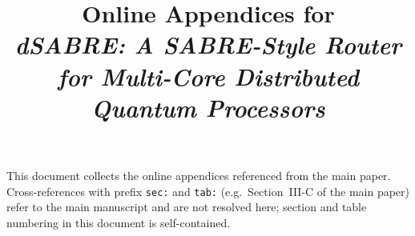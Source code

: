\documentclass[conference]{IEEEtran}
\begin{document}
\title{Online Appendices for \\
       \textit{dSABRE: A SABRE-Style Router for Multi-Core
       Distributed Quantum Processors}}
\author{%
}
\maketitle

\noindent
This document collects the online appendices referenced from the
main paper.  Cross-references with prefix \texttt{sec:} and
\texttt{tab:} (e.g.\ Section~III-C of the main paper) refer to the
main manuscript and are not resolved here; section and table
numbering in this document is self-contained.





\end{document}
